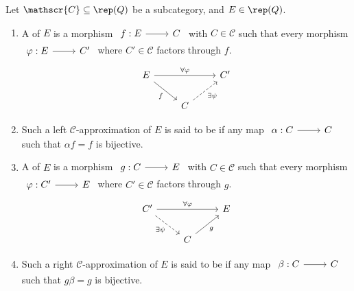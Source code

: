 \begin{definition} \label{def:leftrightminapprox}
Let $\mathscr{C} \subseteq \rep(Q)$ be a subcategory, and $E \in \rep(Q)$. 
\begin{enumerate}[label=$\bullet$, itemsep=1mm]
    \item A  of $E$ is a morphism $\begin{tikzcd}
	f: E & C
	\arrow[from=1-1, to=1-2]
	\end{tikzcd}$ with $C \in \mathscr{C}$ such that every morphism $\begin{tikzcd}
	\varphi: E & C'
	\arrow[from=1-1, to=1-2]
	\end{tikzcd}$ where $C' \in \mathscr{C}$ factors through $f$.
    \[\begin{tikzcd}
	 E & & C' \\
     & C & 
	\arrow["\forall\varphi",from=1-1, to=1-3]
        \arrow["f"', from=1-1, to=2-2]
        \arrow["\exists \psi"', dashed, from=2-2,to=1-3]
	\end{tikzcd}\]
    \item Such a left $\mathscr{C}$-approximation of $E$ is said to be  if any map $\begin{tikzcd}
	\alpha: C & C
	\arrow[from=1-1, to=1-2]
	\end{tikzcd}$ such that $\alpha f = f$ is bijective. 
    \item A  of $E$ is a morphism $\begin{tikzcd}
	g: C & E
	\arrow[from=1-1, to=1-2]
	\end{tikzcd}$ with $C \in \mathscr{C}$ such that every morphism $\begin{tikzcd}
	\varphi: C' & E
	\arrow[from=1-1, to=1-2]
	\end{tikzcd}$ where $C' \in \mathscr{C}$ factors through $g$.
    \[\begin{tikzcd}
	 C' & & E \\
     & C & 
	\arrow["\forall\varphi",from=1-1, to=1-3]
        \arrow["\exists \psi"',dashed, from=1-1, to=2-2]
        \arrow["g"', from=2-2,to=1-3]
	\end{tikzcd}\]
    \item Such a right $\mathscr{C}$-approximation of $E$ is said to be  if any map $\begin{tikzcd}
	\beta: C & C
	\arrow[from=1-1, to=1-2]
	\end{tikzcd}$ such that $g \beta = g$ is bijective. 
\end{enumerate}
\end{definition}

